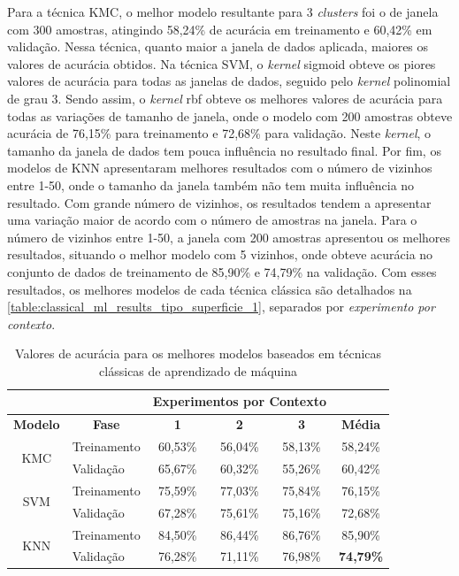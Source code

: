 Para a técnica KMC, o melhor modelo resultante para 3 \textit{clusters} foi o de janela com 300 amostras, atingindo 58,24\% de acurácia em treinamento e 60,42\% em validação. Nessa técnica, quanto maior a janela de dados aplicada, maiores os valores de acurácia obtidos. Na técnica SVM, o \textit{kernel} sigmoid obteve os piores valores de acurácia para todas as janelas de dados, seguido pelo \textit{kernel} polinomial de grau 3. Sendo assim, o \textit{kernel} rbf obteve os melhores valores de acurácia para todas as variações de tamanho de janela, onde o modelo com 200 amostras obteve acurácia de 76,15\% para treinamento e 72,68\% para validação. Neste \textit{kernel}, o tamanho da janela de dados tem pouca influência no resultado final. Por fim, os modelos de KNN apresentaram melhores resultados com o número de vizinhos entre 1-50, onde o tamanho da janela também não tem muita influência no resultado. Com grande número de vizinhos, os resultados tendem a apresentar uma variação maior de acordo com o número de amostras na janela. Para o número de vizinhos entre 1-50, a janela com 200 amostras apresentou os melhores resultados, situando o melhor modelo com 5 vizinhos, onde obteve acurácia no conjunto de dados de treinamento de 85,90\% e 74,79\% na validação. Com esses resultados, os melhores modelos de cada técnica clássica são detalhados na \autoref{table:classical_ml_results_tipo_superficie_1}, separados por \emph{experimento por contexto}.

\begin{table}[H]
\scriptsize
\centering
\caption{Valores de acurácia para os melhores modelos baseados em técnicas clássicas de aprendizado de máquina} 
\label{table:classical_ml_results_tipo_superficie_1}
\begin{tabular}{clcccc}
\cmidrule(lr){3-5}
& & \multicolumn{3}{c}{\textbf{Experimentos por Contexto}} & \multicolumn{1}{c}{} \\ \midrule
\textbf{Modelo} & \multicolumn{1}{c}{\textbf{Fase}} & \textbf{1} & \textbf{2} & \textbf{3} & \textbf{Média} \\ \midrule
\multirow{2}{*}{KMC} & Treinamento & 60,53\% & 56,04\% & 58,13\% & 58,24\% \\ \cmidrule(l){2-6} 
 & Validação & 65,67\% & 60,32\% & 55,26\% & 60,42\% \\ \midrule
\multirow{2}{*}{SVM} & Treinamento & 75,59\% & 77,03\% & 75,84\% & 76,15\% \\ \cmidrule(l){2-6} 
 & Validação & 67,28\% & 75,61\% & 75,16\% & 72,68\% \\ \midrule
\multirow{2}{*}{KNN} & Treinamento & 84,50\% & 86,44\% & 86,76\% & 85,90\% \\ \cmidrule(l){2-6} 
 & Validação & 76,28\% & 71,11\% & 76,98\% & \cellcolor[HTML]{34FF34}\textbf{74,79\%} \\ \bottomrule
\end{tabular}
\end{table}

